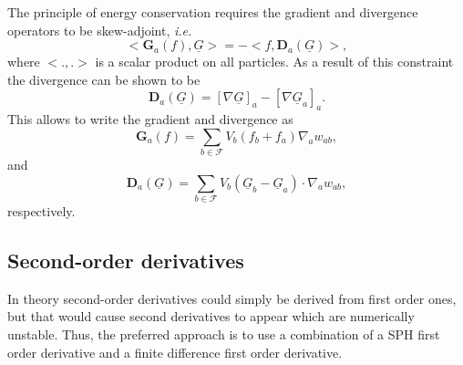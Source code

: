 \documentclass[12pt]{memoir}
\newcommand{\uvec}[1]{\underline{#1}}
\newcommand{\ie}{\textit{i.e.}~}
\newcommand{\sumF}{\underset{b \in \mathcal{F}}{\sum}}
\newcommand{\Grad}{\textbf{G}}
\newcommand{\Div}{\textbf{D}}
\begin{document}

The principle of energy conservation requires the gradient and
divergence operators to be skew-adjoint, \ie
\begin{equation}
<\Grad_a(f), \uvec{G}> = - <f, \Div_a(\uvec{G})>,
\label{e:sph:skew-ajd}
\end{equation}
where $<.,.>$ is a scalar product on all particles. As a result of this
constraint the divergence can be shown to be
\begin{equation}
\Div_a(\uvec{G}) = [\nabla \uvec{G}]_a - [\nabla \uvec{G}_a]_a.
\label{e:sph:div-def}
\end{equation}
This allows to write the gradient and divergence as
\begin{equation}
\Grad_a(f) = \sumF V_b (f_b + f_a) \nabla_a w_{ab},
\label{e:sph:grad}
\end{equation}
and
\begin{equation}
\Div_a(\uvec{G}) = \sumF V_b (\uvec{G}_b - \uvec{G}_a) \cdot \nabla_a w_{ab},
\label{e:sph:div}
\end{equation}
respectively.

\subsection{Second-order derivatives}

In theory second-order derivatives could simply be derived from first
order ones, but that would cause second derivatives to appear which are
numerically unstable. Thus, the preferred approach is to use a
combination of a SPH first order derivative and a finite difference
first order derivative.
\end{document}

